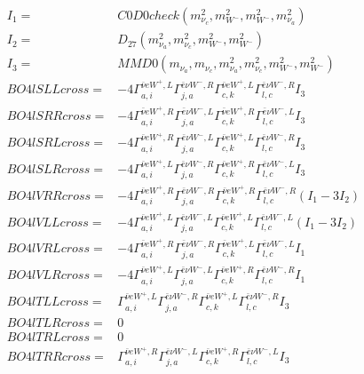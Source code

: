 \documentclass[A4,landscape]{article}
\begin{document}
\begin{align} 
I_1 = & C0D0check(m^2_{\nu_{{c}}}, m^2_{W^-}, m^2_{W^-}, m^2_{\nu_{{a}}}) \\ 
I_2 = & D_{27}(m^2_{\nu_{{a}}}, m^2_{\nu_{{c}}}, m^2_{W^-}, m^2_{W^-}) \\ 
I_3 = & MMD0(m_{\nu_{{a}}}, m_{\nu_{{c}}}, m^2_{\nu_{{a}}}, m^2_{\nu_{{c}}}, m^2_{W^-}, m^2_{W^-}) \\ 
  BO4lSLLcross= & -4  \Gamma^{\bar{\nu}e W^+,L}_{a, i} \Gamma^{\bar{e}\nu W^- ,R}_{j, a} \Gamma^{\bar{\nu}e W^+,L}_{c, k} \Gamma^{\bar{e}\nu W^- ,R}_{l, c} I_3 \\ 
  BO4lSRRcross= & -4  \Gamma^{\bar{\nu}e W^+,R}_{a, i} \Gamma^{\bar{e}\nu W^- ,L}_{j, a} \Gamma^{\bar{\nu}e W^+,R}_{c, k} \Gamma^{\bar{e}\nu W^- ,L}_{l, c} I_3 \\ 
  BO4lSRLcross= & -4  \Gamma^{\bar{\nu}e W^+,R}_{a, i} \Gamma^{\bar{e}\nu W^- ,L}_{j, a} \Gamma^{\bar{\nu}e W^+,L}_{c, k} \Gamma^{\bar{e}\nu W^- ,R}_{l, c} I_3 \\ 
  BO4lSLRcross= & -4  \Gamma^{\bar{\nu}e W^+,L}_{a, i} \Gamma^{\bar{e}\nu W^- ,R}_{j, a} \Gamma^{\bar{\nu}e W^+,R}_{c, k} \Gamma^{\bar{e}\nu W^- ,L}_{l, c} I_3 \\ 
  BO4lVRRcross= & -4  \Gamma^{\bar{\nu}e W^+,R}_{a, i} \Gamma^{\bar{e}\nu W^- ,R}_{j, a} \Gamma^{\bar{\nu}e W^+,R}_{c, k} \Gamma^{\bar{e}\nu W^- ,R}_{l, c} (I_1 - 3 I_2) \\ 
  BO4lVLLcross= & -4  \Gamma^{\bar{\nu}e W^+,L}_{a, i} \Gamma^{\bar{e}\nu W^- ,L}_{j, a} \Gamma^{\bar{\nu}e W^+,L}_{c, k} \Gamma^{\bar{e}\nu W^- ,L}_{l, c} (I_1 - 3 I_2) \\ 
  BO4lVRLcross= & -4  \Gamma^{\bar{\nu}e W^+,R}_{a, i} \Gamma^{\bar{e}\nu W^- ,R}_{j, a} \Gamma^{\bar{\nu}e W^+,L}_{c, k} \Gamma^{\bar{e}\nu W^- ,L}_{l, c} I_1 \\ 
  BO4lVLRcross= & -4  \Gamma^{\bar{\nu}e W^+,L}_{a, i} \Gamma^{\bar{e}\nu W^- ,L}_{j, a} \Gamma^{\bar{\nu}e W^+,R}_{c, k} \Gamma^{\bar{e}\nu W^- ,R}_{l, c} I_1 \\ 
  BO4lTLLcross= &  \Gamma^{\bar{\nu}e W^+,L}_{a, i} \Gamma^{\bar{e}\nu W^- ,R}_{j, a} \Gamma^{\bar{\nu}e W^+,L}_{c, k} \Gamma^{\bar{e}\nu W^- ,R}_{l, c} I_3 \\ 
  BO4lTLRcross= & 0 \\ 
  BO4lTRLcross= & 0 \\ 
  BO4lTRRcross= &  \Gamma^{\bar{\nu}e W^+,R}_{a, i} \Gamma^{\bar{e}\nu W^- ,L}_{j, a} \Gamma^{\bar{\nu}e W^+,R}_{c, k} \Gamma^{\bar{e}\nu W^- ,L}_{l, c} I_3 \\ 
\end{align} 
\end{document}
